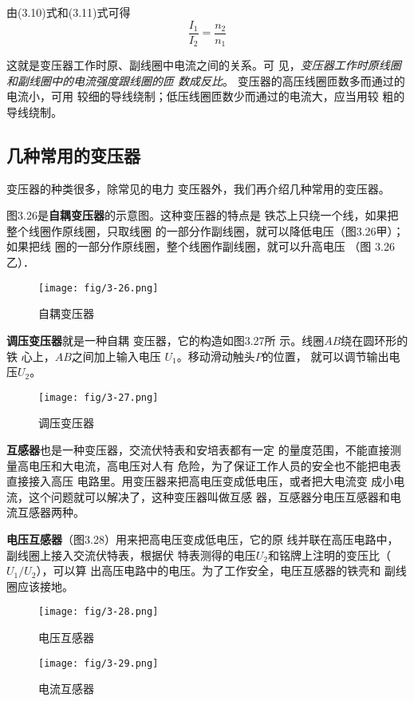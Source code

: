 由(3.10)式和(3.11)式可得
\begin{equation}
    \frac{I_1}{I_2}=\frac{n_2}{n_1}
\end{equation}

这就是变压器工作时原、副线圈中电流之间的关系。可
见，\textit{变压器工作时原线圈和副线圈中的电流强度跟线圈的匝
数成反比}。
变压器的高压线圈匝数多而通过的电流小，可用
较细的导线绕制；低压线圈匝数少而通过的电流大，应当用较
粗的导线绕制。

\subsection{几种常用的变压器}

变压器的种类很多，除常见的电力
变压器外，我们再介绍几种常用的变压器。

图3.26是\textbf{自耦变压器}的示意图。这种变压器的特点是
铁芯上只绕一个线，如果把整个线圈作原线圈，只取线圈
的一部分作副线圈，就可以降低电压（图3.26甲）；如果把线
圈的一部分作原线圈，整个线圈作副线圈，就可以升高电压
（图 3.26乙）．
\begin{figure}[htp]\centering
\texttt{[image: fig/3-26.png]}
\caption{自耦变压器}
\end{figure}

\textbf{调压变压器}就是一种自耦
变压器，它的构造如图3.27所
示。线圈$AB$绕在圆环形的铁
心上，$AB$之间加上输入电压
$U_1$。移动滑动触头$P$的位置，
就可以调节输出电压$U_2$。
\begin{figure}[htp]\centering
\texttt{[image: fig/3-27.png]}
\caption{调压变压器}
\end{figure}

\textbf{互感器}也是一种变压器，交流伏特表和安培表都有一定
的量度范围，不能直接测量高电压和大电流，高电压对人有
危险，为了保证工作人员的安全也不能把电表直接接入高压
电路里。用变压器来把高电压变成低电压，或者把大电流变
成小电流，这个问题就可以解决了，这种变压器叫做互感
器，互感器分电压互感器和电流互感器两种。

\textbf{电压互感器}（图3.28）用来把高电压变成低电压，它的原
线并联在高压电路中，副线圈上接入交流伏特表，根据伏
特表测得的电压$U_2$和铭牌上注明的变压比（$U_1/U_2$），可以算
出高压电路中的电压。为了工作安全，电压互感器的铁壳和
副线圈应该接地。

\begin{figure}[htp]\centering
\texttt{[image: fig/3-28.png]}
\caption{电压互感器}
\end{figure}

\begin{figure}[htp]\centering
\texttt{[image: fig/3-29.png]}
\caption{电流互感器}
\end{figure}

